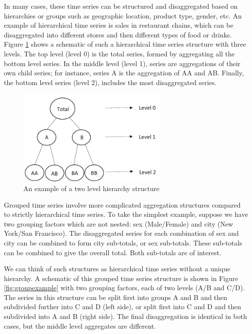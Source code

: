 \documentclass[11pt,a4paper,]{article}
\begin{document}
In many cases, these time series can be structured and disaggregated based on hierarchies or groups such as geographic location, product type, gender, etc. An example of hierarchical time series is sales in restaurant chains, which can be disaggregated into different stores and then different types of food or drinks. Figure \ref{fig:hierarchicalexample} shows a schematic of such a hierarchical time series structure with three levels. The top level (level 0) is the total series, formed by aggregating all the bottom level series. In the middle level (level 1), series are aggregations of their own child series; for instance, series A is the aggregation of AA and AB. Finally, the bottom level series (level 2), includes the most disaggregated series.

\begin{figure}

{\centering \includegraphics[width=280px,height=180px]{Paper-Figures/hierarchical_example} 

}

\caption{An example of a two level hierarchy structure}\label{fig:hierarchicalexample}
\end{figure}

Grouped time series involve more complicated aggregation structures compared to strictly hierarchical time series. To take the simplest example, suppose we have two grouping factors which are not nested: sex (Male/Female) and city (New York/San Francisco). The disaggregated series for each combination of sex and city can be combined to form city sub-totals, or sex sub-totals. These sub-totals can be combined to give the overall total. Both sub-totals are of interest.

We can think of such structures as hierarchical time series without a unique hierarchy. A schematic of this grouped time series structure is shown in Figure \ref{fig:groupexample} with two grouping factors, each of two levels (A/B and C/D). The series in this structure can be split first into groups A and B and then subdivided further into C and D (left side), or split first into C and D and then subdivided into A and B (right side). The final disaggregation is identical in both cases, but the middle level aggregates are different.
\end{document}
